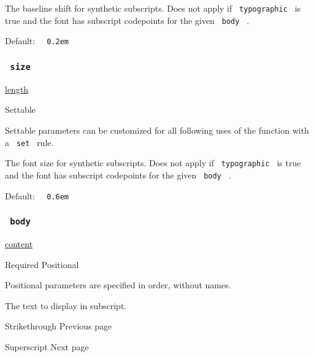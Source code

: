 The baseline shift for synthetic subscripts. Does not apply if
\texttt{\ typographic\ } is true and the font has subscript codepoints
for the given \texttt{\ body\ } .

Default: \texttt{\ }{\texttt{\ 0.2em\ }}\texttt{\ }

\subsubsection{\texorpdfstring{\texttt{\ size\ }}{ size }}\label{parameters-size}

\href{/docs/reference/layout/length/}{length}

{{ Settable }}

\label{parameters-size-settable-tooltip}
Settable parameters can be customized for all following uses of the
function with a \texttt{\ set\ } rule.

The font size for synthetic subscripts. Does not apply if
\texttt{\ typographic\ } is true and the font has subscript codepoints
for the given \texttt{\ body\ } .

Default: \texttt{\ }{\texttt{\ 0.6em\ }}\texttt{\ }

\subsubsection{\texorpdfstring{\texttt{\ body\ }}{ body }}\label{parameters-body}

\href{/docs/reference/foundations/content/}{content}

{Required} {{ Positional }}

\label{parameters-body-positional-tooltip}
Positional parameters are specified in order, without names.

The text to display in subscript.

\href{/docs/reference/text/strike/}{\pandocbounded{}}

{ Strikethrough } { Previous page }

\href{/docs/reference/text/super/}{\pandocbounded{}}

{ Superscript } { Next page }
